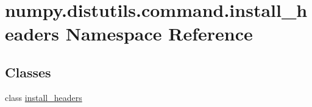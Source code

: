 \hypertarget{namespacenumpy_1_1distutils_1_1command_1_1install__headers}{}\section{numpy.\+distutils.\+command.\+install\+\_\+headers Namespace Reference}
\label{namespacenumpy_1_1distutils_1_1command_1_1install__headers}
\subsection*{Classes}
\begin{DoxyCompactItemize}
\item 
class \hyperlink{classnumpy_1_1distutils_1_1command_1_1install__headers_1_1install__headers}{install\+\_\+headers}
\end{DoxyCompactItemize}

